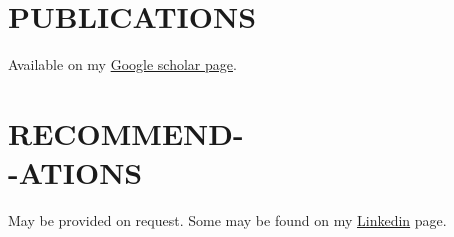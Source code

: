 \documentclass[margin, 10pt]{res} %
\begin{document}
\begin{resume}
\section{PUBLICATIONS} 
Available on my \href{https://scholar.google.com/citations?user=HjM0XDoAAAAJ&hl=en}{Google scholar page}.



\section{RECOMMEND- \\-ATIONS } 
May be provided on request. Some may be found on my \href{https://www.linkedin.com/in/ikramu/}{Linkedin} page.  %


\end{resume}
\end{document}
